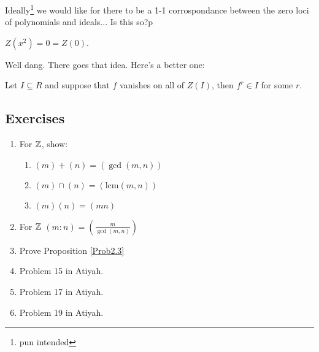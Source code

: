 \documentclass[12pt, twosided]{article}
\begin{document}
  Ideally\footnote{pun intended} we would like for there to be a 1-1 corrospondance between the zero loci of polynomials and ideals... Is this so?p

  \begin{exa}
    \(Z(x^2) = 0 = Z(0)\).
  \end{exa}

  Well dang. There goes that idea. Here's a better one:

  \begin{thm}
    Let \(I \subseteq R\) and suppose that \(f\) vanishes on all of \(Z(I)\), then \(f^r \in I\) for some \(r\).
  \end{thm}

  \subsection{Exercises}
  \begin{enumerate}
  \item For \(\mathbb{Z}\), show:
    \begin{enumerate}
    \item \((m) + (n) = (\gcd(m,n))\)
    \item \((m) \cap (n) = (\mathrm{lcm}(m, n))\)
    \item \((m)(n) = (mn)\)
    \end{enumerate}
  \item For \(\mathbb{Z}\) \((m:n) = \left(\frac{m}{\gcd(m,n)}\right)\)
  \item Prove Proposition \ref{Prob2.3}
  \item Problem 15 in Atiyah.
  \item Problem 17 in Atiyah.
  \item Problem 19 in Atiyah.
  \end{enumerate}
\end{document}
